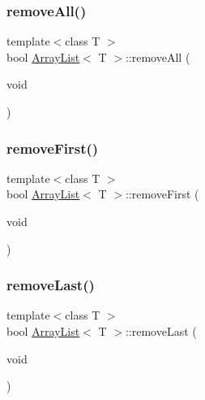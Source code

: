 \mbox{\label{class_array_list_a7e51b6676aaa19cf530e1707d27dfd1f}} 
\subsubsection{\texorpdfstring{remove\+All()}{removeAll()}}
{\footnotesize\ttfamily template$<$class T $>$ \\
bool \hyperlink{class_array_list}{Array\+List}$<$ T $>$\+::remove\+All (\begin{DoxyParamCaption}\item[{void}]{ }\end{DoxyParamCaption})\hspace{0.3cm}{\ttfamily [inline]}}

\mbox{\label{class_array_list_a04be6b9b56212c867b22ca23a9c4e4ab}} 
\subsubsection{\texorpdfstring{remove\+First()}{removeFirst()}}
{\footnotesize\ttfamily template$<$class T $>$ \\
bool \hyperlink{class_array_list}{Array\+List}$<$ T $>$\+::remove\+First (\begin{DoxyParamCaption}\item[{void}]{ }\end{DoxyParamCaption})}

\mbox{\label{class_array_list_aca8e026cfab4748526860c0bd2fafac0}} 
\subsubsection{\texorpdfstring{remove\+Last()}{removeLast()}}
{\footnotesize\ttfamily template$<$class T $>$ \\
bool \hyperlink{class_array_list}{Array\+List}$<$ T $>$\+::remove\+Last (\begin{DoxyParamCaption}\item[{void}]{ }\end{DoxyParamCaption})}


